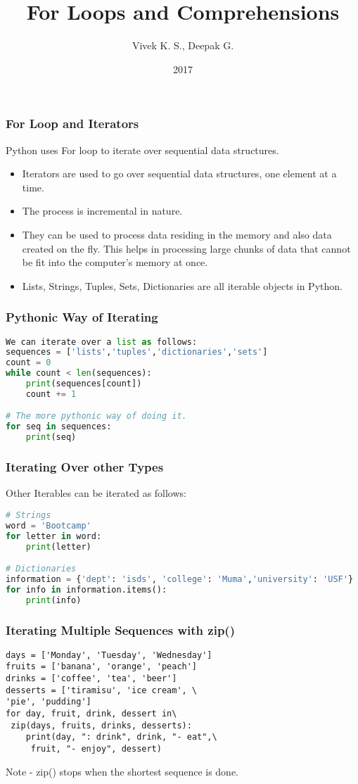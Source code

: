 \documentclass{beamer}
\title{For Loops and Comprehensions}
\author{Vivek K. S., Deepak G.}
\institute{Information Systems Decision Sciences (ISDS)\\
MUMA College of Business\\
University of South Florida \\
Tampa, Florida}
\date{2017}
\begin{document}
\frame{\titlepage}

\begin{frame}
\frametitle{For Loop and Iterators}
Python uses For loop to iterate over sequential data structures.
\begin{itemize}
\item Iterators are used to go over sequential data structures, one element at a time.
\item The process is incremental in nature.
\item They can be used to process data residing in the memory and also data created on the fly. This helps in processing large chunks of data that cannot be fit into the computer's memory at once.
\item Lists, Strings, Tuples, Sets, Dictionaries are all iterable objects in Python.
\end{itemize}
\end{frame}

\begin{frame}[fragile]
\frametitle{Pythonic Way of Iterating}
\begin{lstlisting}[language=Python]
We can iterate over a list as follows:
sequences = ['lists','tuples','dictionaries','sets']
count = 0
while count < len(sequences):
    print(sequences[count])
    count += 1  

# The more pythonic way of doing it.
for seq in sequences:
    print(seq)
\end{lstlisting}
\end{frame}

\begin{frame}[fragile]
\frametitle{Iterating Over other Types}
Other Iterables can be iterated as follows:
\begin{lstlisting}[language=Python]
# Strings
word = 'Bootcamp'
for letter in word:
	print(letter)

# Dictionaries
information = {'dept': 'isds', 'college': 'Muma','university': 'USF'}
for info in information.items():
    print(info)
\end{lstlisting}
\end{frame}

\begin{frame}[fragile]
\frametitle{Iterating Multiple Sequences with zip()}
\begin{lstlisting}
days = ['Monday', 'Tuesday', 'Wednesday']
fruits = ['banana', 'orange', 'peach']
drinks = ['coffee', 'tea', 'beer']
desserts = ['tiramisu', 'ice cream', \
'pie', 'pudding']
for day, fruit, drink, dessert in\
 zip(days, fruits, drinks, desserts):
    print(day, ": drink", drink, "- eat",\
     fruit, "- enjoy", dessert)
\end{lstlisting}

Note - zip() stops when the shortest sequence is done.
\end{frame}
\end{document}
